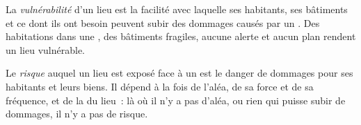 \begin{definition}[Vulnérabilité]\label{def:g9:natural-risks:vulnerability}
La \emph{vulnérabilité} d'un lieu est la facilité avec
laquelle ses habitants, ses bâtiments et ce dont ils ont besoin peuvent
subir des dommages causés par un . Des habitations dans une
, des bâtiments fragiles, aucune alerte et aucun plan
rendent un lieu vulnérable.
\end{definition}

\begin{definition}[Risque]\label{def:g9:natural-risks:risk}
Le \emph{risque} auquel un lieu est exposé face à un  est
le danger de dommages pour ses habitants et leurs biens. Il dépend à la
fois de l'aléa, de sa force et de sa fréquence, et de la  du
lieu~: là où il n'y a pas d'aléa, ou rien qui puisse subir de dommages, il
n'y a pas de risque.
\end{definition}

